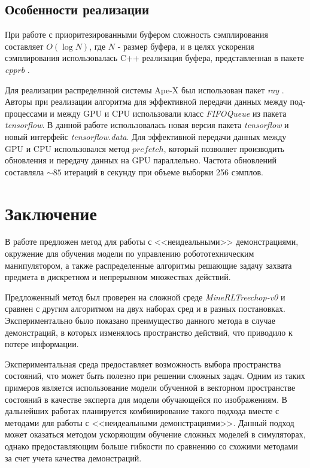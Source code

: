 \documentclass{mipt-thesis-bs}
\begin{document}
\section{Особенности реализации}

При работе с приоритезированными буфером сложность сэмплирования составляет $O(\operatorname{log}N)$, где $N$ - размер буфера, и в целях ускорения сэмплирования использовалась C++ реализация буфера, представленная в пакете \textit{cpprb} \cite{cpprb}.

Для реализации распределнной системы Ape-X \cite{apex} был использован пакет \textit{ray} \cite{ray}. Авторы \cite{apex} при реализации алгоритма для эффективной передачи данных между под-процессами и между GPU и CPU использовали класс \textit{FIFOQueue} из пакета \textit{tensorflow}. В данной работе использовалась новая версия пакета \textit{tensorflow} и новый интерфейс \textit{tensorflow.data}. Для эффективной передачи данных между GPU и CPU использовался метод $prefetch$, который позволяет производить обновления и передачу данных на GPU параллельно. Частота обновлений составляла $\sim85$ итераций в секунду при объеме выборки 256 сэмплов.

\backmatter

\chapter{Заключение}

В работе предложен метод для работы с <<неидеальными>> демонстрациями, окружение для обучения модели по управлению робототехническим манипулятором, а также распределенные алгоритмы решающие задачу захвата предмета в дискретном и непрерывном множествах действий. 

Предложенный метод был проверен на сложной среде \textit{MineRLTreechop-v0} и сравнен с другим алгоритмом на двух наборах сред и в разных постановках. Экспериментально было показано преимущество данного метода в случае демонстраций, в которых изменялось пространство действий, что приводило к потере информации.

Экспериментальная среда предоставляет возможность выбора пространства состояний, что может быть полезно при решении сложных задач. Одним из таких примеров является использование модели обученной в векторном пространстве состояний в качестве эксперта для модели обучающейся по изображениям. В дальнейших работах планируется комбинирование такого подхода вместе с методами для работы с <<неидеальными демонстрациями>>. Данный подход может оказаться методом ускоряющим обучение сложных моделей в симуляторах, однако предоставляющим больше гибкости по сравнению со схожими методами за счет учета качества демонстраций.  
\end{document}
